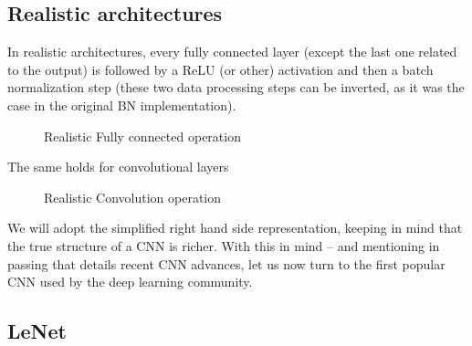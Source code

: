 \subsection{Realistic architectures}

In realistic architectures, every fully connected layer (except the last one related to the output) is followed by a ReLU (or other) activation and then a batch normalization step (these two data processing steps can be inverted, as it was the case in the original BN implementation).
\begin{figure}[H]
\begin{center}
\caption{Realistic Fully connected operation}
\end{center}
\end{figure}
 The same holds for convolutional layers
\begin{figure}[H]
\begin{center}
\caption{Realistic Convolution operation}
\end{center}
\end{figure}

We will adopt the simplified right hand side representation, keeping in mind that the true structure of a CNN is richer. With this in mind -- and mentioning in passing \cite{Gu2015RecentAI} that details recent CNN advances, let us now turn to the first popular CNN used by the deep learning community.

\subsection{LeNet}

